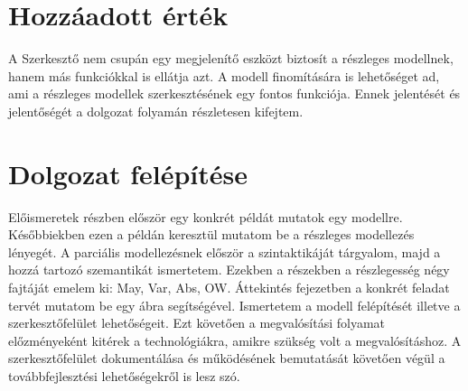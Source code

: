 \section{Hozzáadott érték}	
A Szerkesztő nem csupán egy megjelenítő eszközt biztosít a részleges modellnek, hanem más funkciókkal is ellátja azt. A modell finomítására is lehetőséget ad, ami a részleges modellek szerkesztésének egy fontos funkciója. Ennek jelentését és jelentőségét a dolgozat folyamán részletesen kifejtem.

\section{Dolgozat felépítése}
Előismeretek részben először egy konkrét példát mutatok  egy modellre. Későbbiekben ezen a példán keresztül mutatom be a részleges modellezés lényegét. A parciális modellezésnek először a szintaktikáját tárgyalom, majd a hozzá tartozó szemantikát ismertetem. Ezekben a részekben a részlegesség négy fajtáját emelem ki: May, Var, Abs, OW. Áttekintés fejezetben a konkrét feladat tervét mutatom be egy ábra segítségével. Ismertetem a modell felépítését illetve a szerkesztőfelület lehetőségeit. Ezt követően a megvalósítási folyamat előzményeként kitérek a technológiákra, amikre szükség volt a megvalósításhoz. A szerkesztőfelület dokumentálása és működésének bemutatását követően végül a továbbfejlesztési lehetőségekről is lesz szó. 
